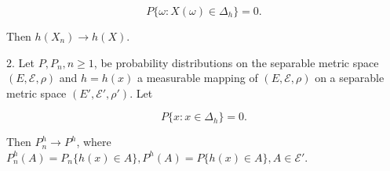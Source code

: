 $$P\{\omega : X(\omega) \in \Delta_h\} = 0. \tag{6}$$

Then $h(X_n) \to h(X)$.

2. Let $P, P_n, n \geq 1$, be probability distributions on the separable metric space $(E, \mathcal{E}, \rho)$ and $h = h(x)$ a measurable mapping of $(E, \mathcal{E}, \rho)$ on a separable metric space $(E', \mathcal{E}', \rho')$. Let

$$P\{x : x \in \Delta_h\} = 0.$$

Then $P_n^h \to P^h$, where $P_n^h(A) = P_n\{h(x) \in A\}, P^h(A) = P\{h(x) \in A\}, A \in \mathcal{E}'$.
